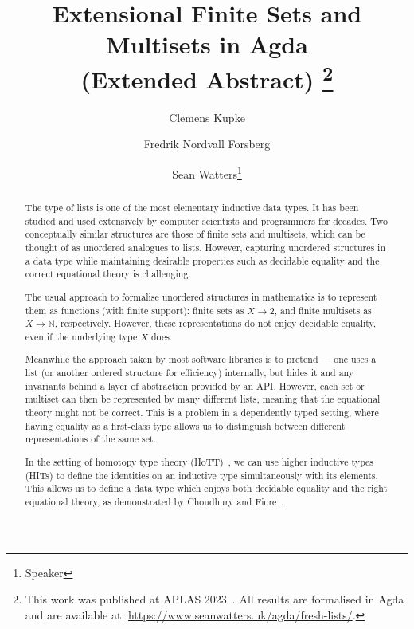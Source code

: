 \documentclass[a4paper]{easychair}
\title{Extensional Finite Sets and Multisets in Agda \\ (Extended Abstract)
\footnote{
This work was published at APLAS 2023~\cite{freshlists}.
All results are formalised in Agda and are available at:
\url{https://www.seanwatters.uk/agda/fresh-lists/}.
}}
\author{
Clemens Kupke
\and
Fredrik Nordvall Forsberg
\and
Sean Watters\thanks{Speaker}
}
\institute{
  University of Strathclyde, UK\\
  \email{\{clemens.kupke, fredrik.nordvall-forsberg, sean.watters\}@strath.ac.uk}
 }
\begin{document}
\maketitle


\begin{abstract}

The type of lists is one of the most elementary inductive data types.
It has been studied and used extensively by computer scientists and programmers for decades.
Two conceptually similar structures are those of finite sets and multisets, which can be thought of as unordered analogues to lists.
However, capturing unordered structures in a data type while maintaining desirable properties such as decidable equality and the correct equational theory is challenging.

The usual approach to formalise unordered structures in mathematics
is to represent them as functions (with finite support): finite sets as $X \to 2$, and finite multisets as $X \to \mathbb{N}$, respectively.
However, these representations do not enjoy decidable equality, even if the underlying type $X$ does.

Meanwhile the approach taken by most software libraries is to pretend --- one uses a list (or another ordered structure for efficiency) internally, but hides it and any invariants behind a layer of abstraction provided by an API.
However, each set or multiset can then be represented by many different lists,
meaning that the equational theory might not be correct. This is a problem
in a dependently typed setting, where
having equality as a first-class type allows us to
distinguish between different representations of the same set.


In the setting of homotopy type theory (HoTT)~\cite{hottbook}, we can use higher inductive types (HITs) to define the identities on an inductive type simultaneously with its elements.
This allows us to define a data type which enjoys both decidable equality and the right equational theory, as demonstrated by Choudhury and Fiore~\cite{choudhuryfiore2023freecommmon}.


\end{abstract}
\end{document}

